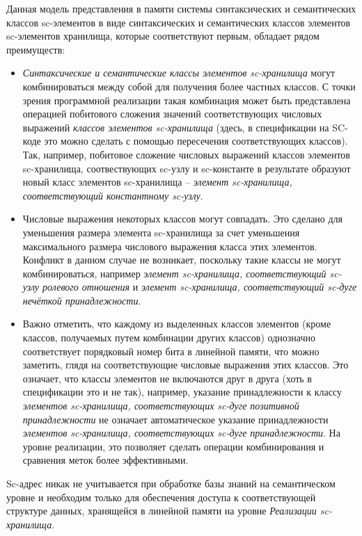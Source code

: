 Данная модель представления в памяти системы синтаксических и семантических классов sc-элементов в виде синтаксических и семантических классов элементов sc-элементов хранилища, которые соответствуют первым, обладает рядом преимуществ:
\begin{itemize}
    \item \textit{Синтаксические и семантические классы элементов sc-хранилища} могут комбинироваться между собой для получения более частных классов. С точки зрения программной реализации такая комбинация может быть представлена операцией побитового сложения значений соответствующих числовых выражений \textit{классов элементов sc-хранилища} (здесь, в спецификации на SC-коде это можно сделать с помощью пересечения соответствующих классов). Так, например, побитовое сложение числовых выражений классов элементов sc-хранилища, соотвествующих sc-узлу и sc-константе в результате образуют новый класс элементов sc-хранилища -- \textit{элемент sc-хранилища, соответствующий константному sc-узлу}.
    \item Числовые выражения некоторых классов могут совпадать. Это сделано для уменьшения размера элемента sc-хранилища за счет уменьшения максимального размера числового выражения класса этих элементов. Конфликт в данном случае не возникает, поскольку такие классы не могут комбинироваться, например \textit{элемент sc-хранилища, соответствующий sc-узлу ролевого отношения} и \textit{элемент sc-хранилища, соответствующий sc-дуге нечёткой принадлежности}.
    \item Важно отметить, что каждому из выделенных классов элементов (кроме классов, получаемых путем комбинации других классов) однозначно соответствует порядковый номер бита в линейной памяти, что можно заметить, глядя на соответствующие числовые выражения этих классов. Это означает, что классы элементов не включаются друг в друга (хоть в спецификации это и не так), например, указание принадлежности к классу \textit{элементов sc-хранилища, соответствующих sc-дуге позитивной принадлежности} не означает автоматическое указание принадлежности \textit{элементов sc-хранилища, соответствующих sc-дуге принадлежности}. На уровне реализации, это позволяет сделать операции комбинирования и сравнения меток более эффективными.
\end{itemize}

Sc-адрес никак не учитывается при обработке базы знаний на семантическом уровне и необходим только для обеспечения доступа к соответствующей структуре данных, хранящейся в линейной памяти на уровне \textit{Реализации sc-хранилища}.


